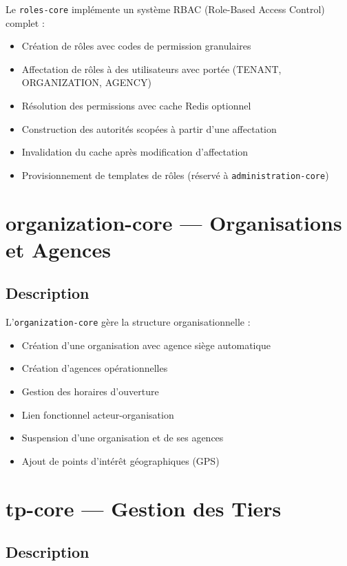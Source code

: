 \documentclass[12pt,a4paper]{report}
\begin{document}
Le \texttt{roles-core} implémente un système RBAC (Role-Based Access Control) complet :

\begin{itemize}[leftmargin=2cm]
  \item Création de rôles avec codes de permission granulaires
  \item Affectation de rôles à des utilisateurs avec portée (TENANT, ORGANIZATION, AGENCY)
  \item Résolution des permissions avec cache Redis optionnel
  \item Construction des autorités scopées à partir d'une affectation
  \item Invalidation du cache après modification d'affectation
  \item Provisionnement de templates de rôles (réservé à \texttt{administration-core})
\end{itemize}

\section{organization-core — Organisations et Agences}

\subsection{Description}

L'\texttt{organization-core} gère la structure organisationnelle :

\begin{itemize}[leftmargin=2cm]
  \item Création d'une organisation avec agence siège automatique
  \item Création d'agences opérationnelles
  \item Gestion des horaires d'ouverture
  \item Lien fonctionnel acteur-organisation
  \item Suspension d'une organisation et de ses agences
  \item Ajout de points d'intérêt géographiques (GPS)
\end{itemize}

\section{tp-core — Gestion des Tiers}

\subsection{Description}
\end{document}
